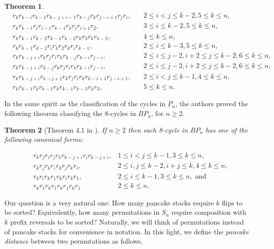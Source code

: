 \documentclass[final]{dmtcs-episciences}
\numberwithin{equation}{section}
\newtheorem{thm}{Theorem}[section]
\begin{document}
\begin{thm}
\begin{align}
    \label{P9-3}&r_{k}r_{k-i}r_{k-1}r_{k-j+i-1}r_{k-j}r_{k}r_{j-i+1}r_{j}r_{i}, &\quad 2 \leq i < j \leq k-2, 5 \leq k \leq n,\\
    \label{P9-4}&r_{k}r_{k-1}r_{i}r_{i-1}r_{k-1}r_{k}r_{i}r_{i+1}r_{2}, &\quad 3 \leq i \leq k-2, 5 \leq k \leq n,\\
    \label{P9-5}&r_{k}r_{k-1}r_{k-2}r_{k-1}r_{k-2}r_{k}r_{3}r_{k}r_{k-2}, &\quad 4 \leq k \leq n,\\
    \label{P9-6}&r_{k}r_{k-1}r_{k-2}r_{i}r_{k}r_{2}r_{k}r_{i}r_{k-1}, &\quad 2 \leq i \leq k-3, 5 \leq k \leq n,\\
    \label{P9-7}&r_{k}r_{k-j+i}r_{k}r_{j}r_{i}r_{k}r_{k-j}r_{k-i}r_{j-i}, &\quad 2 \leq i \leq j-2, i+2 \leq j \leq k-2, 6 \leq k \leq n,\\
    \label{P9-8}&r_{k}r_{k-j+i}r_{k-j}r_{k}r_{j}r_{i}r_{k}r_{k-i}r_{j-i}, &\quad 2 \leq i \leq j-2, i+2 \leq j \leq k-2, 6 \leq k \leq n,\\
    \label{P9-9}&r_{k}r_{k-j+i}r_{k-j+1}r_{k}r_{j}r_{i}r_{k}r_{k-i+1}r_{j-i+1}, &\quad 2 \leq i < j \leq k-1, 4 \leq k \leq n,\\
    \label{P9-10}&r_{k}r_{k-1}r_{k}r_{k-1}r_{k}r_{k-1}r_{k-3}r_{k}r_{3}, &\quad 5 \leq k \leq n.
\end{align}
\end{thm}


In the same spirit as the classification of the cycles in $P_n$, the authors proved the following theorem classifying the 8-cycles in $BP_n$, for $n\geq2$.

\begin{thm}[Theorem 4.1 in \cite{BBP2018}]\label{t:burntpancakeclassification}
If $n\geq2$ then each 8-cycle in $BP_n$ has one of the following canonical forms:

\begin{align}
    \label{BP-8-1}
    &r_{k}r_{j}r_{i}r_{j}r_{k}r_{k-j+i}r_{i}r_{k-j+i}, & 1 \leq i < j \leq k-1, 3 \leq k \leq n,\\
    \label{BP-8-2}
    &r_{k}r_{j}r_{k}r_{i}r_{k}r_{j}r_{k}r_{i}, & 2 \leq i,j \leq k-2, i+j \leq k, 4 \leq k \leq n,\\
    \label{BP-8-3}
    &r_{k}r_{i}r_{k}r_{1}r_{k}r_{i}r_{k}r_{1}, &2 \leq i \leq k-1,  3 \leq k \leq n,\text{ and}\\
    \label{BP-8-4}
    &r_{k}r_{1}r_{k}r_{1}r_{k}r_{1}r_{k}r_{1} & 2 \leq k \leq n.
\end{align}
\end{thm}

Our question is a very natural one: How many pancake stacks require $k$ flips to be sorted? Equivalently, how many permutations in $S_n$ require composition with $k$ prefix reversals to be sorted? Naturally, we will think of permutations instead of pancake stacks for convenience in notation. In this light, we define the \emph{pancake distance} between two permutations as follows.
\end{document}
